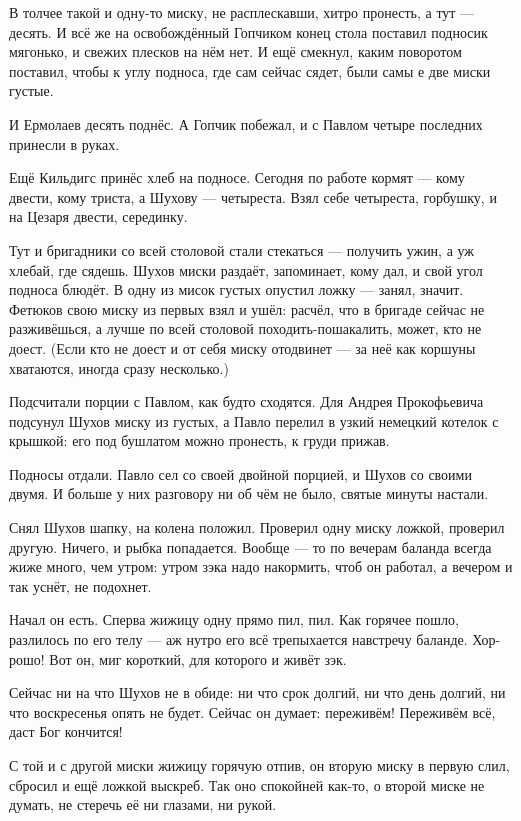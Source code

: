 В толчее такой и одну-то миску, не расплескавши, хитро пронесть, а тут --- десять. И всё же на освобождённый Гопчиком конец стола поставил подносик мягонько, и свежих плесков на нём нет. И ещё смекнул, каким поворотом поставил, чтобы к углу подноса, где сам сейчас сядет, были самы е две миски густые.

И Ермолаев десять поднёс. А Гопчик побежал, и с Павлом четыре последних принесли в руках.

Ещё Кильдигс принёс хлеб на подносе. Сегодня по работе кормят --- кому двести, кому триста, а Шухову --- четыреста. Взял себе четыреста, горбушку, и на Цезаря двести, серединку.

Тут и бригадники со всей столовой стали стекаться --- получить ужин, а уж хлебай, где сядешь. Шухов миски раздаёт, запоминает, кому дал, и свой угол подноса блюдёт. В одну из мисок густых опустил ложку --- занял, значит. Фетюков свою миску из первых взял и ушёл: расчёл, что в бригаде сейчас не разживёшься, а лучше по всей столовой походить-пошакалить, может, кто не доест. (Если кто не доест и от себя миску отодвинет --- за неё как коршуны хватаются, иногда сразу несколько.)

Подсчитали порции с Павлом, как будто сходятся. Для Андрея Прокофьевича подсунул Шухов миску из густых, а Павло перелил в узкий немецкий котелок с крышкой: его под бушлатом можно пронесть, к груди прижав.

Подносы отдали. Павло сел со своей двойной порцией, и Шухов со своими двумя. И больше у них разговору ни об чём не было, святые минуты настали.

Снял Шухов шапку, на колена положил. Проверил одну миску ложкой, проверил другую. Ничего, и рыбка попадается. Вообще --- то по вечерам баланда всегда жиже много, чем утром: утром зэка надо накормить, чтоб он работал, а вечером и так уснёт, не подохнет.

Начал он есть. Сперва жижицу одну прямо пил, пил. Как горячее пошло, разлилось по его телу --- аж нутро его всё трепыхается навстречу баланде. Хор-рошо! Вот он, миг короткий, для которого и живёт зэк.

Сейчас ни на что Шухов не в обиде: ни что срок долгий, ни что день долгий, ни что воскресенья опять не будет. Сейчас он думает: переживём! Переживём всё, даст Бог кончится!

С той и с другой миски жижицу горячую отпив, он вторую миску в первую слил, сбросил и ещё ложкой выскреб. Так оно спокойней как-то, о второй миске не думать, не стеречь её ни глазами, ни рукой.

